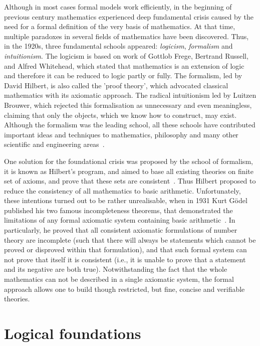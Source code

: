 \documentclass[article]{aaltoseries}
\begin{document}
Although in most cases formal models work efficiently, in the beginning of previous century mathematics experienced deep fundamental crisis caused by the need for a formal definition of the very basis of mathematics. At that time, multiple paradoxes in several fields of mathematics have been discovered. Thus, in the 1920s, three fundamental schools appeared: \textit{logicism}, \textit{formalism} and \textit{intuitionism}. The logicism is based on work of Gottlob Frege, Bertrand Russell, and Alfred Whitehead, which stated that mathematics is an extension of logic and therefore it can be reduced to logic partly or fully. The formalism, led by David Hilbert, is also called the 'proof theory', which advocated classical mathematics with its axiomatic approach. The radical intuitionism led by Luitzen Brouwer, which rejected this formalisation as unnecessary and even meaningless, claiming that only the objects, which we know how to construct, may exist.
Although the formalism was the leading school, all these schools have contributed important ideas and techniques to mathematics, philosophy and many other scientific and engineering areas~\cite{Fer08}.

One solution for the foundational crisis was proposed by the school of formalism, it is known as Hilbert's program, and aimed to base all existing theories on finite set of axioms, and prove that these sets are consistent~\cite{Zac06}. Thus Hilbert proposed to reduce the consistency of all mathematics to basic arithmetic. 
Unfortunately, these intentions turned out to be rather unrealisable, when in 1931 Kurt Gödel published his two famous incompleteness theorems, that demonstrated the limitations of any formal axiomatic system containing basic arithmetic~\cite{Raa15}. In particularly, he proved that all consistent axiomatic formulations of number theory are incomplete (such that there will always be statements which cannot be proved or disproved within that formulation), and that such formal system can not prove that itself it is consistent (i.e., it is unable to prove that a statement and its negative are both true).
Notwithstanding the fact that the whole mathematics can not be described in a single axiomatic system, the formal approach allows one to build though restricted, but fine, concise and verifiable theories.


\section{Logical foundations}
\label{sec:formal_theory}
\end{document}
